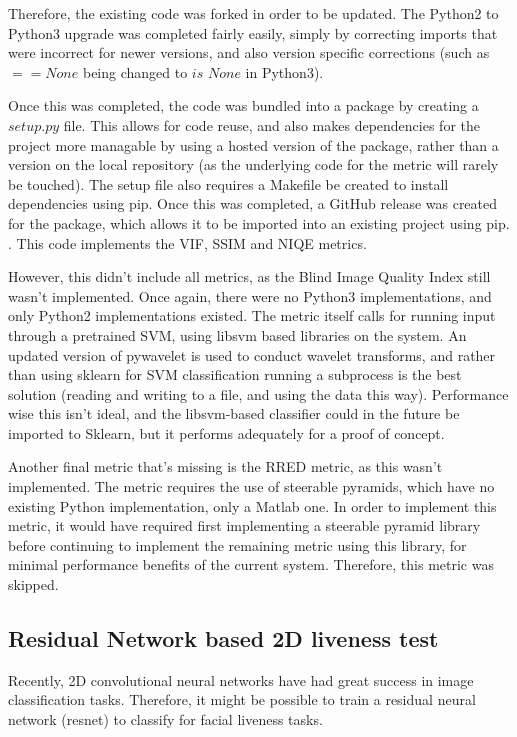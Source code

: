 \documentclass[10pt,a4paper]{article}
\begin{document}
        Therefore, the existing code was forked in order to be updated. The Python2 to Python3 upgrade was completed fairly easily, simply by correcting imports that were incorrect
        for newer versions, and also version specific corrections (such as $== None$ being changed to $is$ $None$ in Python3).
        
        Once this was completed, the code was bundled into a package by creating a $setup.py$ file. This allows for code reuse, and also makes dependencies for the project
        more managable by using a hosted version of the package, rather than a version on the local repository (as the underlying code for the metric will rarely be touched).
        The setup file also requires a Makefile be created to install dependencies using pip. Once this was completed, a GitHub release was created for the package, which allows it to be
        imported into an existing project using pip. \cite{VideoQualityUpdated}. This code implements the VIF, SSIM and NIQE metrics.

        However, this didn't include all metrics, as the Blind Image Quality Index still wasn't implemented. Once again, there were no Python3 implementations, and only Python2 implementations existed.
        The metric itself calls for running input through a pretrained SVM, using libsvm based libraries on the system. An updated version of pywavelet is used to conduct wavelet transforms, and rather than using sklearn for SVM classification
        running a subprocess is the best solution (reading and writing to a file, and using the data this way). Performance wise this isn't ideal, and the libsvm-based classifier could in the future be
        imported to Sklearn, but it performs adequately for a proof of concept.

        Another final metric that's missing is the RRED metric, as this wasn't implemented. The metric requires the use of steerable pyramids, which have no existing Python implementation, only a Matlab one. In order to implement this metric, it would have required first implementing a steerable pyramid library
        before continuing to implement the remaining metric using this library, for minimal performance benefits of the current system. Therefore, this metric was skipped. \cite{RRED}


    \subsection{Residual Network based 2D liveness test}
        Recently, 2D convolutional neural networks have had great success in image classification tasks. Therefore, it might be possible to train
        a residual neural network (resnet) to classify for facial liveness tasks.
\end{document}
